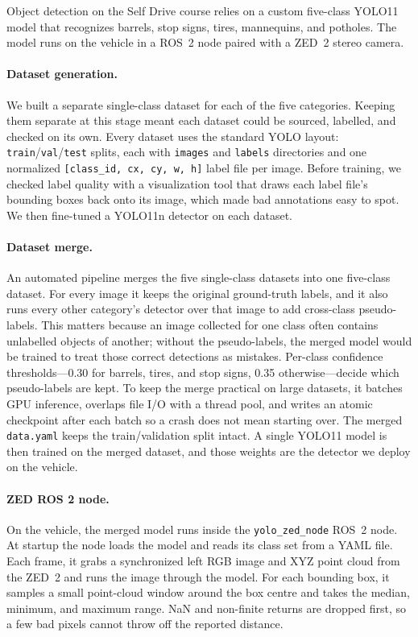 Object detection on the Self Drive course relies on a custom five-class
YOLO11 model that recognizes barrels, stop signs, tires, mannequins,
and potholes. The model runs on the vehicle in a ROS~2 node paired with
a ZED~2 stereo camera.
 
\paragraph{Dataset generation.} We built a separate single-class
dataset for each of the five categories. Keeping them separate at this
stage meant each dataset could be sourced, labelled, and checked on its
own. Every dataset uses the standard YOLO layout:
\texttt{train}/\texttt{val}/\texttt{test} splits, each with
\texttt{images} and \texttt{labels} directories and one normalized
\texttt{[class\_id, cx, cy, w, h]} label file per image. Before
training, we checked label quality with a visualization tool that draws
each label file's bounding boxes back onto its image, which made bad
annotations easy to spot. We then fine-tuned a YOLO11n detector on each
dataset.
 
\paragraph{Dataset merge.} An automated pipeline merges the five
single-class datasets into one five-class dataset. For every image it
keeps the original ground-truth labels, and it also runs every other
category's detector over that image to add cross-class pseudo-labels.
This matters because an image collected for one class often contains
unlabelled objects of another; without the pseudo-labels, the merged
model would be trained to treat those correct detections as mistakes.
Per-class confidence thresholds---0.30 for barrels, tires, and stop
signs, 0.35 otherwise---decide which pseudo-labels are kept. To keep
the merge practical on large datasets, it batches GPU inference,
overlaps file I/O with a thread pool, and writes an atomic checkpoint
after each batch so a crash does not mean starting over. The merged
\texttt{data.yaml} keeps the train/validation split intact. A single
YOLO11 model is then trained on the merged dataset, and those weights
are the detector we deploy on the vehicle.
 
\paragraph{ZED ROS 2 node.} On the vehicle, the merged model runs
inside the \texttt{yolo\_zed\_node} ROS~2 node. At startup the node
loads the model and reads its class set from a YAML file. Each frame,
it grabs a synchronized left RGB image and XYZ point cloud from the
ZED~2 and runs the image through the model. For each bounding box, it
samples a small point-cloud window around the box centre and takes the
median, minimum, and maximum range. NaN and non-finite returns are
dropped first, so a few bad pixels cannot throw off the reported
distance.
 
